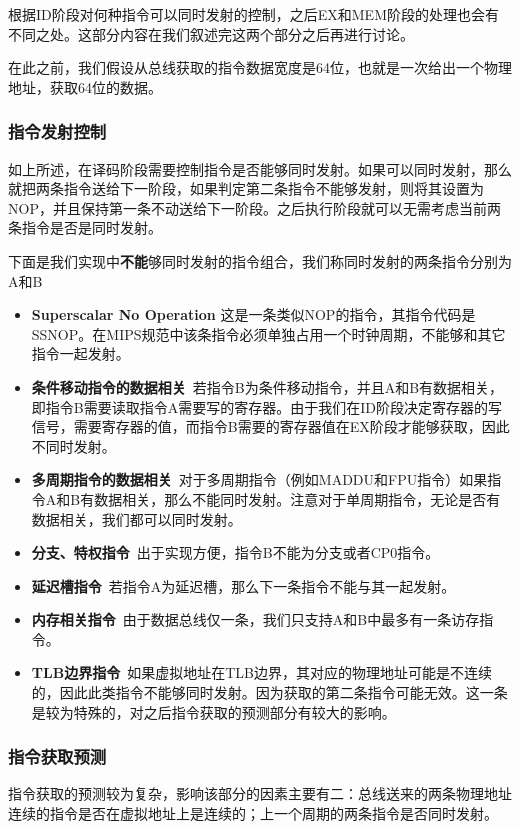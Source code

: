 根据ID阶段对何种指令可以同时发射的控制，之后EX和MEM阶段的处理也会有不同之处。这部分内容在我们叙述完这两个部分之后再进行讨论。

在此之前，我们假设从总线获取的指令数据宽度是64位，也就是一次给出一个物理地址，获取64位的数据。

\subsubsection{指令发射控制}
如上所述，在译码阶段需要控制指令是否能够同时发射。如果可以同时发射，那么就把两条指令送给下一阶段，如果判定第二条指令不能够发射，则将其设置为NOP，并且保持第一条不动送给下一阶段。之后执行阶段就可以无需考虑当前两条指令是否是同时发射。

下面是我们实现中\textbf{不能}够同时发射的指令组合，我们称同时发射的两条指令分别为A和B

\begin{itemize}
\item \textbf{Superscalar No Operation} 这是一条类似NOP的指令，其指令代码是SSNOP。在MIPS规范中该条指令必须单独占用一个时钟周期，不能够和其它指令一起发射。

\item \textbf{条件移动指令的数据相关}\ 若指令B为条件移动指令，并且A和B有数据相关，即指令B需要读取指令A需要写的寄存器。由于我们在ID阶段决定寄存器的写信号，需要寄存器的值，而指令B需要的寄存器值在EX阶段才能够获取，因此不同时发射。

\item \textbf{多周期指令的数据相关}\ 对于多周期指令（例如MADDU和FPU指令）如果指令A和B有数据相关，那么不能同时发射。注意对于单周期指令，无论是否有数据相关，我们都可以同时发射。

\item \textbf{分支、特权指令}\ 出于实现方便，指令B不能为分支或者CP0指令。

\item \textbf{延迟槽指令}\ 若指令A为延迟槽，那么下一条指令不能与其一起发射。

\item \textbf{内存相关指令}\ 由于数据总线仅一条，我们只支持A和B中最多有一条访存指令。

\item \textbf{TLB边界指令}\ 如果虚拟地址在TLB边界，其对应的物理地址可能是不连续的，因此此类指令不能够同时发射。因为获取的第二条指令可能无效。这一条是较为特殊的，对之后指令获取的预测部分有较大的影响。
\end{itemize}

\subsubsection{指令获取预测}
指令获取的预测较为复杂，影响该部分的因素主要有二：总线送来的两条物理地址连续的指令是否在虚拟地址上是连续的；上一个周期的两条指令是否同时发射。

